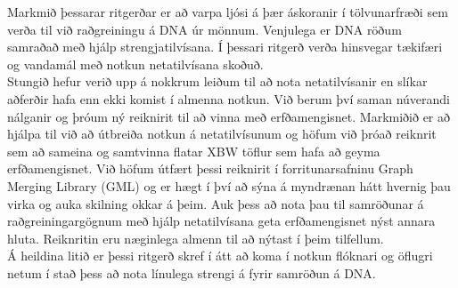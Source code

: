 \documentclass[a4paper,12pt,twoside,BCOR=10mm]{scrbook}
\begin{document}
Markmið þessarar ritgerðar er að varpa ljósi á þær áskoranir í tölvunarfræði sem verða til við raðgreiningu á DNA úr mönnum. Venjulega er DNA röðum samraðað með hjálp strengjatilvísana. Í þessari ritgerð verða hinsvegar tækifæri og vandamál með notkun netatilvísana skoðuð. \\
Stungið hefur verið upp á nokkrum leiðum til að nota netatilvísanir en slíkar aðferðir hafa enn ekki komist í almenna notkun. Við berum því saman núverandi nálganir og þróum ný reiknirit til að vinna með erfðamengisnet.
Markmiðið er að hjálpa til við að útbreiða notkun á netatilvísunum og höfum við þróað reiknrit sem að sameina og samtvinna flatar XBW töflur sem hafa að geyma erfðamengisnet. Við höfum útfært þessi reiknirit í forritunarsafninu Graph Merging Library (GML) og er hægt í því að sýna á myndrænan hátt hvernig þau virka og auka skilning okkar á þeim.
Auk þess að nota þau til samröðunar á raðgreiningargögnum með hjálp netatilvísana geta erfðamengisnet nýst annara hluta. Reiknritin eru næginlega almenn til að nýtast í þeim tilfellum. \\
Á heildina litið er þessi ritgerð skref í átt að koma í notkun flóknari og öflugri netum í stað þess að nota línulega strengi á fyrir samröðun á DNA.

\end{document}
